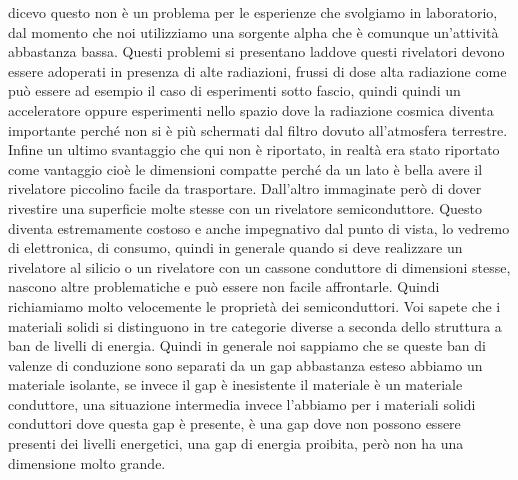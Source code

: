 dicevo questo non è un problema per le esperienze che svolgiamo in laboratorio, dal momento che noi utilizziamo una sorgente alpha che è comunque un'attività abbastanza bassa. Questi problemi si presentano laddove questi rivelatori devono essere adoperati in presenza di alte radiazioni, frussi di dose alta radiazione come può essere ad esempio il caso di esperimenti sotto fascio, quindi quindi un acceleratore oppure esperimenti nello spazio dove la radiazione cosmica diventa importante perché non si è più schermati dal filtro dovuto all'atmosfera terrestre. Infine un ultimo svantaggio che qui non è riportato, in realtà era stato riportato come vantaggio cioè le dimensioni compatte perché da un lato è bella avere il rivelatore piccolino facile da trasportare. Dall'altro immaginate però di dover rivestire una superficie molte stesse con un rivelatore semiconduttore. Questo diventa estremamente costoso e anche impegnativo dal punto di vista, lo vedremo di elettronica, di consumo, quindi in generale quando si deve realizzare un rivelatore al silicio o un rivelatore con un cassone conduttore di dimensioni stesse, nascono altre problematiche e può essere non facile affrontarle. Quindi richiamiamo molto velocemente le proprietà dei semiconduttori. Voi sapete che i materiali solidi si distinguono in tre categorie diverse a seconda dello struttura a ban de livelli di energia. Quindi in generale noi sappiamo che se queste ban di valenze di conduzione sono separati da un gap abbastanza esteso abbiamo un materiale isolante, se invece il gap è inesistente il materiale è un materiale conduttore, una situazione intermedia invece l'abbiamo per i materiali solidi conduttori dove questa gap è presente, è una gap dove non possono essere presenti dei livelli energetici, una gap di energia proibita, però non ha una dimensione molto grande.


